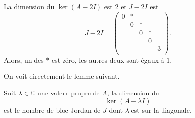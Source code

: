 \begin{example} 
  \label{exe:53}
  La dimension du $\ker(A - 2 I)$ est $2$ et $J - 2I$ est
  \begin{displaymath}
     J  - 2I =
  \begin{pmatrix}
    0 & *  \\
    & 0 & * \\
    & & 0 & * \\
    & & & 0   \\
    & & & & 3 \\
  \end{pmatrix}. 
\end{displaymath}
Alors, un des $*$ est zéro, les autres deux sont égaux à $1$. 
\end{example}
\noindent
On voit directement le lemme suivant. 
\begin{lemma}
  \label{lem:29}
  Soit $λ ∈ℂ$ une valeur propre de $A$, la dimension de
  \begin{displaymath}
    \ker( A - λI) 
  \end{displaymath}
  est le nombre de bloc Jordan de $J$ dont  $λ$ est sur  la diagonale.  
\end{lemma}



